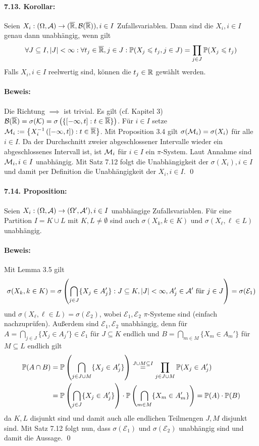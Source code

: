 \paragraph{7.13. Korollar:}Seien $X_i:(\Omega,\mathcal{A})\to(\overline{\mathbb{R}},\mathcal{B}(\overline{\mathbb{R}})),i\in I$ Zufallsvariablen. Dann sind die $X_i,i\in I$ genau dann unabh\"angig, wenn gilt
$$\forall J\subseteq I,|J|<\infty:\forall t_j\in\overline{\mathbb{R}},j\in J:\mathbb{P}(X_j\leqslant t_j,j\in J)=\prod_{j\in J}\mathbb{P}(X_j\leqslant t_j)$$
Falls $X_i,i\in I$  reelwertig sind, k\"onnen die $t_j\in\mathbb{R}$ gew\"ahlt werden. 

\paragraph{Beweis:}Die Richtung $\implies$ ist trivial. Es gilt (cf. Kapitel 3) $\mathcal{B}(\overline{\mathbb{R}})=\sigma(\mathcal{K})=\sigma\left(\{[-\infty,t]:t\in\overline{\mathbb{R}}\}\right)$. F\"ur $i\in I$ setze $\mathcal{M}_i:=\left\{X_i^{-1}\left([-\infty,t]\right):t\in\overline{\mathbb{R}}\right\}$. Mit Proposition 3.4 gilt $\sigma(\mathcal{M}_i)=\sigma(X_i)$ f\"ur alle $i\in I$. Da der Durchschnitt zweier abgeschlossener Intervalle wieder ein abgeschlossenes Intervall ist, ist $\mathcal{M}_i$ f\"ur $i\in I$ ein $\pi$-System. Laut Annahme sind $\mathcal{M}_i,i\in I$ unabh\"angig. Mit Satz 7.12 folgt die Unabh\"angigkeit der $\sigma(X_i),i\in I$ und damit per Definition die Unabh\"angigkeit der $X_i,i\in I$. \qed

\paragraph{7.14. Proposition:}Seien $X_i:(\Omega,\mathcal{A})\to(\Omega',\mathcal{A}'),i\in I$ unabh\"angige Zufallsvariablen. F\"ur eine Partition $I=K\cup L$ mit $K,L\neq\emptyset$ sind auch $\sigma(X_k,k\in K)$ und $\sigma(X_\ell,\ell\in L)$ unabh\"angig. 

\paragraph{Beweis:}Mit Lemma 3.5 gilt
$$\sigma(X_k,k\in K)=\sigma\left(\bigcap_{j\in J}\{X_j\in A_j'\}:J\subseteq K,|J|<\infty,A_j'\in\mathcal{A}' \text{ f\"ur }j\in J\right)=\sigma(\mathcal{E}_1)$$
und $\sigma(X_\ell,\ell\in L)=\sigma(\mathcal{E}_2)$, wobei $\mathcal{E}_1,\mathcal{E}_2$ $\pi$-Systeme sind (einfach nachzupr\"ufen). Au\ss{}erdem sind $\mathcal{E}_1,\mathcal{E}_2$ unabh\"angig, denn f\"ur $\displaystyle A=\bigcap_{j\in J}\{X_j\in A_j'\}\in \mathcal{E}_1$ f\"ur $J\subseteq K$ endlich und $\displaystyle B=\bigcap_{m\in M}\{X_m\in A_m'\}$ f\"ur $M\subseteq L$ endlich gilt
\begin{align*}
    \mathbb{P}(A\cap B)&=\mathbb{P}\left(\bigcap_{j\in J\cup M}\{X_j\in A_j'\}\right)\overset{J\cup M\subseteq I}{=}\prod_{j\in J\cup M}\mathbb{P}(X_j\in A_j')\\
    &=\mathbb{P}\left(\bigcap_{j\in J}\{X_j\in A_j'\}\right)\cdot\mathbb{P}\left(\bigcap_{m\in M}\{X_m\in A_m'\}\right)=\mathbb{P}(A)\cdot\mathbb{P}(B)
\end{align*}
da $K,L$ disjunkt sind und damit auch alle endlichen Teilmengen $J,M$ disjunkt sind. Mit Satz 7.12 folgt nun, dass $\sigma(\mathcal{E}_1)$ und $\sigma(\mathcal{E}_2)$ unabh\"angig sind und damit die Aussage. \qed

